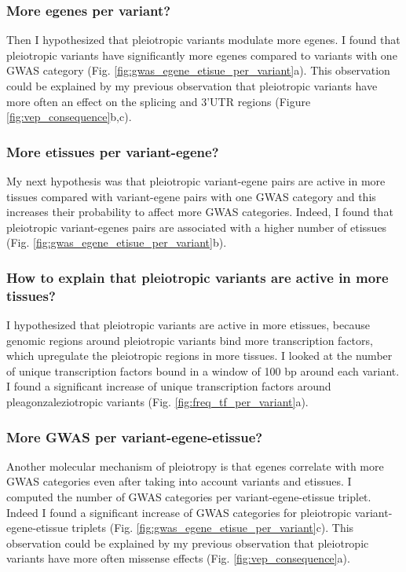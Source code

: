 \subsubsection*{More egenes per variant?}

Then I hypothesized that pleiotropic variants modulate more egenes.
%
I found that pleiotropic variants have significantly more egenes compared to variants with one GWAS category (Fig. \ref{fig:gwas_egene_etisue_per_variant}a).
%
This observation could be explained by my previous observation that pleiotropic variants have more often an effect on the splicing and 3'UTR regions (Figure \ref{fig:vep_consequence}b,c).

\subsubsection*{More etissues per variant-egene?}

My next hypothesis was that pleiotropic variant-egene pairs are active in more tissues compared with variant-egene pairs with one GWAS category and this increases their probability to affect more GWAS categories.
%
Indeed, I found that pleiotropic variant-egenes pairs are associated with a higher number of etissues (Fig. \ref{fig:gwas_egene_etisue_per_variant}b).

\subsubsection*{How to explain that pleiotropic variants are active in more tissues?}

I hypothesized that pleiotropic variants are active in more etissues, because genomic regions around pleiotropic variants bind more transcription factors, which upregulate the pleiotropic regions in more tissues.
%
I looked at the number of unique transcription factors bound in a window of 100 bp around each variant.
%
I found a significant increase of unique transcription factors around pleagonzaleziotropic variants (Fig. \ref{fig:freq_tf_per_variant}a).


\subsubsection*{More GWAS per variant-egene-etissue?}

Another molecular mechanism of pleiotropy is that egenes correlate with more GWAS categories even after taking into account variants and etissues.
%
I computed the number of GWAS categories per variant-egene-etissue triplet.
%
Indeed I found a significant increase of GWAS categories for pleiotropic variant-egene-etissue triplets (Fig. \ref{fig:gwas_egene_etisue_per_variant}c).
%
This observation could be explained by my previous observation that pleiotropic variants have more often missense effects (Fig. \ref{fig:vep_consequence}a).

